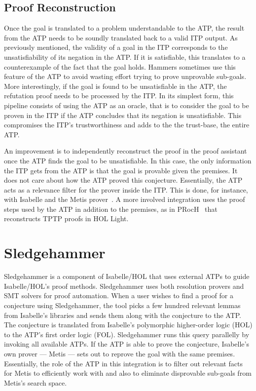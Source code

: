 \documentclass{article}
\begin{document}
		\subsection{Proof Reconstruction}
		Once the goal is translated to a problem understandable 
		to the ATP, the result from the ATP needs to be 
		soundly translated back to a valid ITP output.
		As previously mentioned, the validity of a goal in 
		the ITP corresponds to the unsatisfiability of its 
		negation in the ATP. If it is satisfiable, this 
		translates to a counterexample of the fact that 
		the goal holds. Hammers sometimes use this 
		feature of the ATP to avoid wasting effort 
		trying to prove unprovable sub-goals. More 
		interestingly, if the goal is found to be 
		unsatisfiable in the ATP, the refutation proof 
		needs to be processed by the ITP. In its simplest 
		form, this pipeline consists 
		of using the ATP as an oracle, that is to consider 
		the goal to be proven in the ITP if the ATP 
		concludes that its negation is unsatisfiable. 
		This compromises the ITP's trustworthiness and adds 
		to the the trust-base, the entire ATP.
		
		An improvement is to independently reconstruct 
		the proof in the proof assistant once the ATP finds 
		the goal to be unsatisfiable. In this case, the 
		only information the ITP gets from the ATP is that 
		the goal is provable given the premises. It does 
		not care about how the ATP proved this conjecture.
		Essentially, the ATP acts as a relevance filter for 
		the prover inside the ITP. This is done, for instance, 
		with Isabelle and the Metis 
		prover~\cite{10.1007/978-3-540-74591-4_18}. A more
		involved integration uses the proof steps used by 
		the ATP in addition to the premises, as in 
		PRocH~\cite{10.1007/978-3-642-38574-2_18} that reconstructs TPTP proofs in HOL Light.
		
\section{Sledgehammer}
\label{sec:sledgehammer}
	Sledgehammer is a component of Isabelle/HOL that uses 
	external ATPs to guide Isabelle/HOL's proof methods. 
	Sledgehammer uses both resolution provers and 
	SMT solvers for proof automation. When a user wishes 
	to find a proof for a conjecture using Sledgehammer, 
	the tool picks a few hundred relevant lemmas from 
	Isabelle's libraries and sends them along 
	with the conjecture to the ATP. The conjecture is 
	translated from Isabelle's polymorphic higher-order 
	logic (HOL) to the ATP's first order logic (FOL).
	Sledgehammer runs this query parallelly by invoking 
	all available ATPs. If the ATP is able to prove 
	the conjecture, Isabelle's own prover --- Metis --- sets 
	out to reprove the goal with the same premises. 
	Essentially, the role of the ATP in this integration 
	is to filter out relevant facts for Metis to 
	efficiently work with and also to eliminate 
	disprovable sub-goals from Metis's search space.
	
\end{document}
